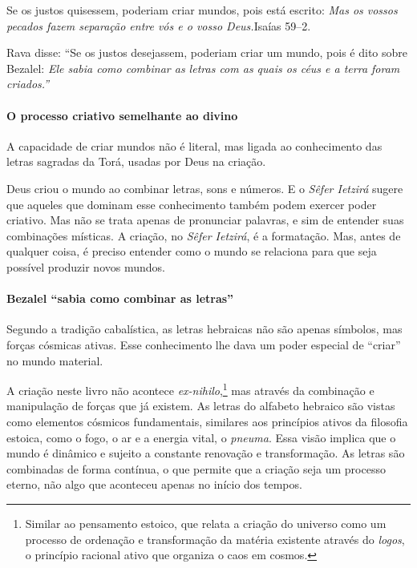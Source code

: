 {Se os justos quisessem, poderiam criar mundos, pois está escrito: \textit{Mas os vossos pecados fazem separação entre vós e o vosso Deus.}{Isaías 59--2.}

{Rava disse: ``Se os justos desejassem, poderiam criar um mundo, pois é dito sobre Bezalel: \textit{Ele sabia como combinar as letras com as quais os céus e a terra foram criados.''}}

\begin{center}
{\huge{}}
\end{center}

\paragraph{O processo criativo semelhante ao divino} A capacidade de criar mundos não é literal, mas ligada ao conhecimento das letras sagradas da Torá, usadas por Deus na criação.


Deus criou o mundo ao combinar letras, sons e números. E o \textit{Sêfer Ietzirá} sugere que aqueles que dominam esse conhecimento também podem exercer poder criativo. Mas não se trata apenas de pronunciar palavras, e sim de entender suas combinações místicas. A criação, no \textit{Sêfer Ietzirá}, é a formatação. Mas, antes de qualquer coisa, é preciso entender como o mundo se relaciona para que seja possível produzir novos mundos. 

\paragraph{Bezalel ``sabia como combinar as letras''} Segundo a tradição cabalística, as letras hebraicas não são apenas símbolos, mas forças cósmicas ativas. Esse conhecimento lhe dava um poder especial de ``criar'' no mundo material.


A criação neste livro não acontece \textit{ex-nihilo},\footnote{Similar ao pensamento estoico, que relata a criação do universo como um processo de ordenação e transformação da matéria existente através do \textit{logos}, o princípio racional ativo que organiza o caos em cosmos.} mas através da combinação e manipulação de forças que já existem. As letras do alfabeto hebraico são vistas como elementos cósmicos fundamentais, similares aos princípios ativos da filosofia estoica, como o fogo, o ar e a energia vital, o \textit{pneuma}. Essa visão implica que o mundo é dinâmico e sujeito a constante renovação e transformação. As letras são combinadas de forma contínua, o que permite que a criação seja um processo eterno, não algo que aconteceu apenas no início dos tempos.

}
